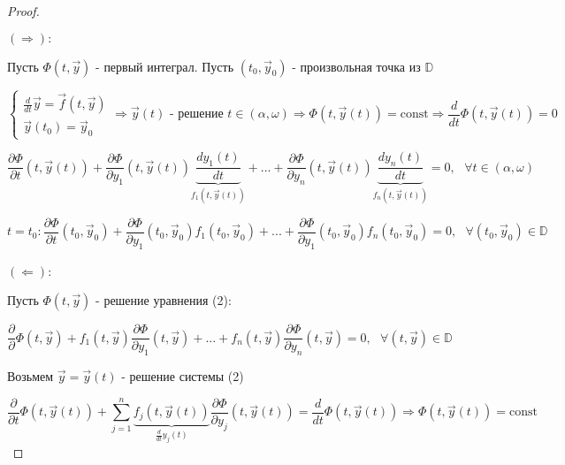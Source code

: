 \documentclass[12pt, a4paper]{report}
\begin{document}
\begin{proof} \(  \) 

    \( (\Rightarrow): \) 

    Пусть \( \Phi(t, \vec{y } )  \) - первый интеграл. Пусть \( (t_0 ,\vec{y} _0 ) \)  - произвольная точка из \( \mathbb{D} \) 

    \[ \begin{cases}
    \displaystyle  \frac{d}{dt }  \vec{ y}  = \vec{f } (t, \vec{y } ) \\ 
    \vec{ y } (t_0 ) = \vec{ y} _0 
    \end{cases} \Rightarrow \vec{y } (t ) \text{ - решение } t \in  (\alpha , \omega) \Rightarrow \Phi(t, \vec{y } (t )) = \mathrm{const }  \Rightarrow \frac{d}{dt }  \Phi(t, \vec{ y} (t )) =0  \] 

    \[ \frac{\partial  \Phi }{\partial  t }(t, \vec{ y}  (t )) + \frac{\partial  \Phi }{\partial  y_1 } (t, \vec{ y}  (t )) \underbrace{\frac{d y_1 (t )}{dt }}_{f_1(t,\vec{ y} (t))} +... + \frac{\partial  \Phi }{\partial y_n }(t , \vec{ y}  (t )) \underbrace{ \frac{d y_n (t )}{dt }}_{f_n(t, \vec{ y} (t))} = 0   , \text{ }  \forall  t \in  (\alpha , \omega )   \] 

    \[ t =t_0 : \frac{\partial  \Phi }{\partial  t } (t_0 ,\vec{ y}_0 ) + \frac{\partial  \Phi }{\partial  y_1 } (t_0 ,\vec{ y} _0 )f_1 (t_0, \vec{ y} _0 )+... + \frac{\partial  \Phi }{\partial  y_1 }(t_0 , \vec{ y} _0) f_n (t_0 ,\vec{ y} _0 ) = 0 , \text{ }  \forall  (t_0 , \vec{ y} _0 )\in  \mathbb{D}     \] \\

    \( (\Leftarrow): \) 

    Пусть \( \Phi(t, \vec{ y} ) \) - решение уравнения (2): 

    \[ \frac{\partial  }{\partial  } \Phi(t, \vec{ y}  ) + f_1 (t, \vec{ y}  ) \frac{\partial  \Phi }{\partial  y_1 } (t ,\vec{ y}  )+ ... + f_n (t, \vec{ y} ) \frac{\partial \Phi }{\partial  y_n }(t, \vec{ y}  ) =0 , \text{ }  \forall  (t, \vec{ y} ) \in \mathbb{D}   \] 

    Возьмем \( \vec{ y } = \vec{ y } (t ) \) - решение системы (2) 

    \[ \frac{\partial  }{\partial  t } \Phi(t, \vec{ y} (t )) + \sum_{j =1}^{n }   \underbrace{ f_j (t,\vec{ y} (t )) }_{\frac{d}{dt } y_j(t)}\frac{\partial  \Phi }{\partial  y_j }(t, \vec{ y} (t ) ) = \frac{d}{dt }  \Phi(t,\vec{ y} (t )) \Rightarrow \Phi(t, \vec{ y} (t )) = \mathrm{const}     \] 

\end{proof}
\end{document}

